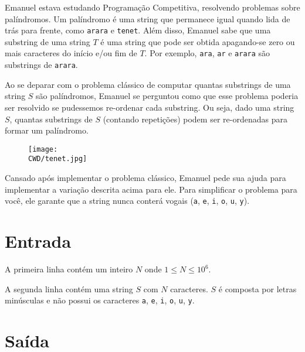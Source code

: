 %

Emanuel estava estudando Programação Competitiva, resolvendo problemas sobre palíndromos. Um palíndromo é uma string que permanece igual quando lida de trás para frente, como {\tt arara} e {\tt tenet}. Além disso, Emanuel sabe que uma substring de uma string $T$ é uma string que pode ser obtida apagando-se zero ou mais caracteres do início e/ou fim de $T$. Por exemplo, {\tt ara}, {\tt ar} e {\tt arara} são substrings de {\tt arara}.

Ao se deparar com o problema clássico de computar quantas substrings de uma string $S$ são palíndromos, Emanuel se perguntou como que esse problema poderia ser resolvido se pudessemos re-ordenar cada substring. Ou seja, dado uma string $S$, quantas substrings de $S$ (contando repetições) podem ser re-ordenadas para formar um palíndromo.

\begin{figure}[H]
    \centering
    \texttt{[image: \\CWD/tenet.jpg]}
\end{figure}

Cansado após implementar o problema clássico, Emanuel pede sua ajuda para implementar a variação descrita acima para ele. Para simplificar o problema para você, ele garante que a string nunca conterá vogais ({\tt a}, {\tt e}, {\tt i}, {\tt o}, {\tt u}, {\tt y}).

%
%

\section*{Entrada}

A primeira linha contém um inteiro $N$ onde $1 \leq N \leq 10^6$.

A segunda linha contém uma string $S$ com $N$ caracteres. $S$ é composta por letras minúsculas e não possui os caracteres {\tt a}, {\tt e}, {\tt i}, {\tt o}, {\tt u}, {\tt y}.

%
%

\section*{Saída}

